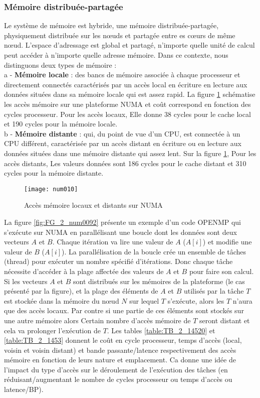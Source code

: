 \subsubsection{Mémoire distribuée-partagée}
%
Le système de mémoire est hybride, une mémoire distribuée-partagée, physiquement distribuée sur les nœuds et partagée entre es cœurs de même nœud. L'espace d'adressage est global et partagé, n'importe quelle unité de calcul peut accéder à n'importe quelle adresse mémoire. Dans ce contexte, nous distinguons deux types de mémoire :\\
%
a - \textbf{Mémoire locale} : des bancs de mémoire associée à chaque processeur et directement connectés caractérisés par un accès local en écriture en lecture aux données situées dans sa mémoire locale qui est assez rapid. La figure \ref{fig:FG_2_num010} schématise les accès mémoire sur une plateforme NUMA et coût correspond en fonction des cycles processeur. Pour les accès locaux, Elle donne 38 cycles pour le cache local et 190 cycles pour la mémoire locale.\\
%
b - \textbf{Mémoire distante} : qui, du point de vue d'un CPU, est connectée à un CPU différent, caractérisée par un accès distant en écriture ou en lecture aux données situées dans une mémoire distante qui assez lent. %
Sur la figure \ref{fig:FG_2_num010}, Pour les accès distants, Les valeurs données sont 186 cycles pour le cache distant et 310 cycles pour la mémoire distante.
%
\begin{figure}
\texttt{[image: num010]}
\centering
\caption{Accès mémoire locaux et distants sur NUMA}
\label{fig:FG_2_num010}
\end{figure}
%
La figure \ref{fig:FG_2_num0092} présente un exemple d'un code OPENMP qui s'exécute sur NUMA en parallélisant une boucle dont les données sont deux vecteurs $A$ et $B$. Chaque itération va lire une valeur de $A$ ($A[i]$) et modifie une valeur de $B$ ($A[i]$). La parallélisation de la boucle crée un ensemble de tâches (thread) pour exécuter un nombre spécifié d'itérations. Donc chaque tâche nécessite d'accéder à la plage affectée des valeurs de $A$ et $B$ pour faire son calcul. Si les vecteurs $A$ et $B$ sont distribués sur les mémoires de la plateforme (le cas présenté par la figure), et la plage des éléments de $A$ et $B$ utilisés par la tâche $T$ est stockée dans la mémoire du nœud $N$ sur lequel $T$ s'exécute, alors les $T$ n'aura que des accès locaux. Par contre si une partie de ces éléments sont stockés sur une autre mémoire alors Certain nombre d'accès mémoire de $T$ seront distant et cela va prolonger l'exécution de $T$. Les tables \ref{table:TB_2_14520} et \ref{table:TB_2_1453} donnent le coût en cycle processeur, temps d'accès (local, voisin et voisin distant) et bande passante/latence respectivement des accès mémoire en fonction de leurs nature et emplacement. Ca donne une idée de l'impact du type d'accès sur le déroulement de l'exécution des tâches (en réduisant/augmentant le nombre de cycles processeur ou temps d'accès ou latence/BP).
